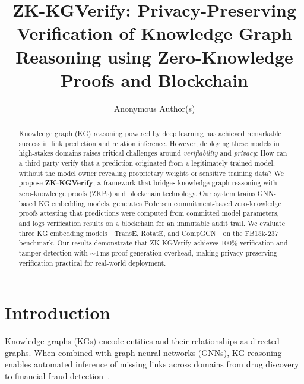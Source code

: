 \documentclass[runningheads]{llncs}
\begin{document}
\title{ZK-KGVerify: Privacy-Preserving Verification of Knowledge Graph Reasoning using Zero-Knowledge Proofs and Blockchain}

\author{Anonymous Author(s)}

\maketitle

\begin{abstract}
Knowledge graph (KG) reasoning powered by deep learning has achieved remarkable success in link prediction and relation inference. However, deploying these models in high-stakes domains raises critical challenges around \emph{verifiability} and \emph{privacy}: How can a third party verify that a prediction originated from a legitimately trained model, without the model owner revealing proprietary weights or sensitive training data? We propose \textbf{ZK-KGVerify}, a framework that bridges knowledge graph reasoning with zero-knowledge proofs (ZKPs) and blockchain technology. Our system trains GNN-based KG embedding models, generates Pedersen commitment-based zero-knowledge proofs attesting that predictions were computed from committed model parameters, and logs verification results on a blockchain for an immutable audit trail. We evaluate three KG embedding models---TransE, RotatE, and CompGCN---on the FB15k-237 benchmark. Our results demonstrate that ZK-KGVerify achieves 100\% verification and tamper detection with ${\sim}$1\,ms proof generation overhead, making privacy-preserving verification practical for real-world deployment.

\end{abstract}

\section{Introduction}
\label{sec:introduction}

Knowledge graphs (KGs) encode entities and their relationships as directed graphs. When combined with graph neural networks (GNNs), KG reasoning enables automated inference of missing links across domains from drug discovery~\cite{zitnik2018modeling} to financial fraud detection~\cite{weber2019anti}.
\end{document}
